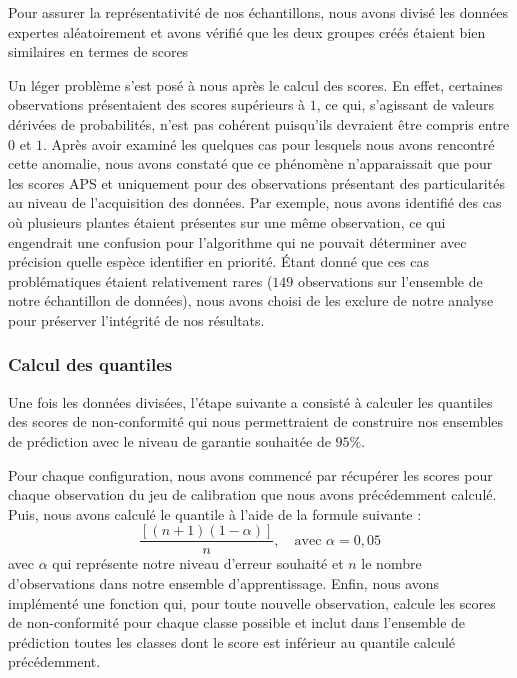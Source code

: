 \documentclass[a4paper,12pt]{article}
\begin{document}
Pour assurer la représentativité de nos échantillons, nous avons divisé les données expertes aléatoirement et avons vérifié que les deux groupes créés étaient bien similaires en termes de scores

\vspace{0.2cm}

Un léger problème s'est posé à nous après le calcul des scores. En effet, certaines observations présentaient des scores supérieurs à $1$, ce qui, s'agissant de valeurs dérivées de probabilités, n'est pas cohérent puisqu'ils devraient être compris entre $0$ et $1$. Après avoir examiné les quelques cas pour lesquels nous avons rencontré cette anomalie, nous avons constaté que ce phénomène n'apparaissait que pour les scores APS et uniquement pour des observations présentant des particularités au niveau de l'acquisition des données. Par exemple, nous avons identifié des cas où plusieurs plantes étaient présentes sur une même observation, ce qui engendrait une confusion pour l'algorithme qui ne pouvait déterminer avec précision quelle espèce identifier en priorité. Étant donné que ces cas problématiques étaient relativement rares ($149$ observations sur l'ensemble de notre échantillon de données), nous avons choisi de les exclure de notre analyse pour préserver l'intégrité de nos résultats.

\subsubsection{Calcul des quantiles}

Une fois les données divisées, l'étape suivante a consisté à calculer les quantiles des scores de non-conformité qui nous permettraient de construire nos ensembles de prédiction avec le niveau de garantie souhaitée de $95\%$.

\vspace{0.2cm}

Pour chaque configuration, nous avons commencé par récupérer les scores pour chaque observation du jeu de calibration que nous avons précédemment calculé. Puis, nous avons calculé le quantile à l'aide de la formule suivante : $$\frac{[(n+1)(1 - \alpha)]}{n}, \quad \text{avec } \alpha = 0,05$$ avec $\alpha$ qui représente notre niveau d'erreur souhaité et $n$ le nombre d'observations dans notre ensemble d'apprentissage. Enfin, nous avons implémenté une fonction qui, pour toute nouvelle observation, calcule les scores de non-conformité pour chaque classe possible et inclut dans l'ensemble de prédiction toutes les classes dont le score est inférieur au quantile calculé précédemment.
\end{document}
